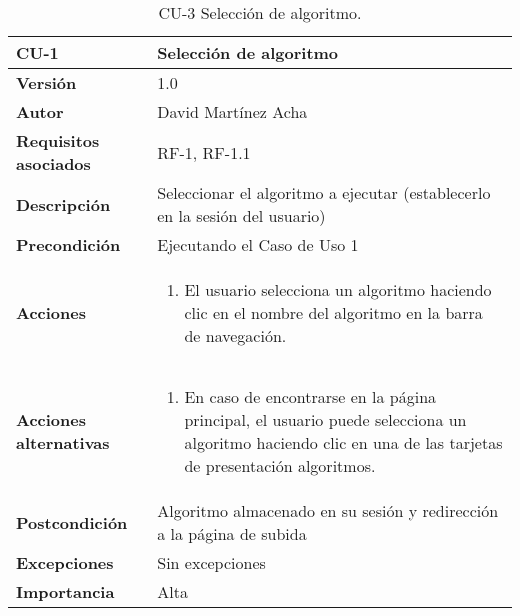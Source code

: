 \begin{table}[p]
	\centering
	\begin{tabularx}{\linewidth}{ p{} p{} }
		\toprule
		\textbf{CU-1}    & \textbf{Selección de algoritmo}\\
		\toprule
		\textbf{Versión}              & 1.0    \\
		\textbf{Autor}                & David Martínez Acha \\
		\textbf{Requisitos asociados} & RF-1, RF-1.1 \\
		\textbf{Descripción}          & Seleccionar el algoritmo a ejecutar (establecerlo en la sesión del usuario) \\
		\textbf{Precondición}         & Ejecutando el Caso de Uso 1 \\
		\textbf{Acciones}             &
		\begin{enumerate}
			\def\labelenumi{\arabic{enumi}.}
			\tightlist
			\item El usuario selecciona un algoritmo haciendo clic en el nombre del algoritmo en la barra de navegación.
		\end{enumerate}\\
        \textbf{Acciones alternativas}&
		\begin{enumerate}
			\def\labelenumi{\arabic{enumi}.}
			\tightlist
			\item En caso de encontrarse en la página principal, el usuario
		puede selecciona un algoritmo haciendo clic en una de las tarjetas de
		presentación algoritmos. \end{enumerate}\\
		\textbf{Postcondición}        & Algoritmo almacenado en su sesión y redirección a la página de subida \\
		\textbf{Excepciones}          & Sin excepciones \\
		\textbf{Importancia}          & Alta \\
		\bottomrule
	\end{tabularx}
	\caption{CU-3 Selección de algoritmo.}
\end{table}

